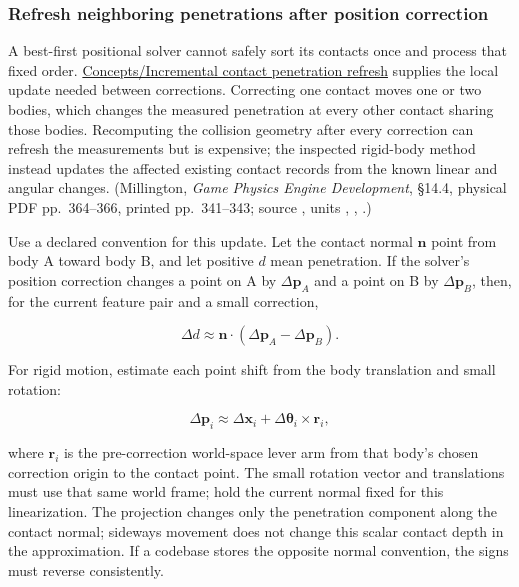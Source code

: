 \subsubsection{Refresh neighboring penetrations after position correction}\label{06-engine-ii-ch046-refresh-neighboring-penetrations-after-position-correction}

\hypertarget{06-engine-ii-ch046-refresh-neighboring-penetrations-after-position-correction}{}

A best-first positional solver cannot safely sort its contacts once and process that fixed order. \hyperref[appendix-f682275acbdf]{Concepts/Incremental contact penetration refresh} supplies the local update needed between corrections. Correcting one contact moves one or two bodies, which changes the measured penetration at every other contact sharing those bodies. Recomputing the collision geometry after every correction can refresh the measurements but is expensive; the inspected rigid-body method instead updates the affected existing contact records from the known linear and angular changes. (Millington, \emph{Game Physics Engine Development}, §14.4, physical PDF pp.~364--366, printed pp.~341--343; source , units , , .)

Use a declared convention for this update. Let the contact normal \(\mathbf n\) point from body A toward body B, and let positive \(d\) mean penetration. If the solver's position correction changes a point on A by \(\Delta\mathbf p_A\) and a point on B by \(\Delta\mathbf p_B\), then, for the current feature pair and a small correction,

\[
\Delta d\approx \mathbf n\cdot(\Delta\mathbf p_A-\Delta\mathbf p_B).
\]

For rigid motion, estimate each point shift from the body translation and small rotation:

\[
\Delta\mathbf p_i\approx \Delta\mathbf x_i+\Delta\boldsymbol\theta_i\times\mathbf r_i,
\]

where \(\mathbf r_i\) is the pre-correction world-space lever arm from that body's chosen correction origin to the contact point. The small rotation vector and translations must use that same world frame; hold the current normal fixed for this linearization. The projection changes only the penetration component along the contact normal; sideways movement does not change this scalar contact depth in the approximation. If a codebase stores the opposite normal convention, the signs must reverse consistently.


